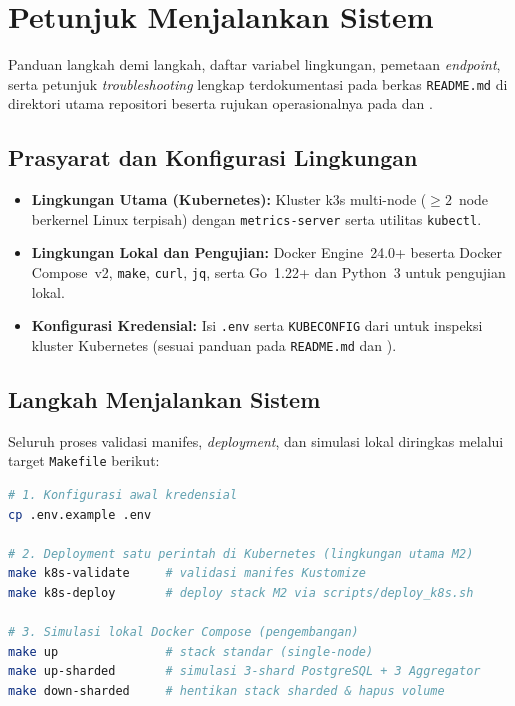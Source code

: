 \chapter{Petunjuk Menjalankan Sistem}
\label{chap:petunjuk}

Panduan langkah demi langkah, daftar variabel lingkungan, pemetaan \textit{endpoint}, serta petunjuk \textit{troubleshooting} lengkap terdokumentasi pada berkas \texttt{README.md} di direktori utama repositori beserta rujukan operasionalnya pada  dan .

\section{Prasyarat dan Konfigurasi Lingkungan}
\label{sec:petunjuk_prasyarat}

\begin{itemize}
    \item \textbf{Lingkungan Utama (Kubernetes):} Kluster k3s multi-node ($\ge 2$~node berkernel Linux terpisah) dengan \texttt{metrics-server} serta utilitas \texttt{kubectl}.
    \item \textbf{Lingkungan Lokal dan Pengujian:} Docker Engine~24.0+ beserta Docker Compose~v2, \texttt{make}, \texttt{curl}, \texttt{jq}, serta Go~1.22+ dan Python~3 untuk pengujian lokal.
    \item \textbf{Konfigurasi Kredensial:} Isi \texttt{.env} serta \texttt{KUBECONFIG} dari  untuk inspeksi kluster Kubernetes (sesuai panduan pada \texttt{README.md} dan ).
\end{itemize}

\section{Langkah Menjalankan Sistem}
\label{sec:petunjuk_menjalankan}

Seluruh proses validasi manifes, \textit{deployment}, dan simulasi lokal diringkas melalui target \texttt{Makefile} berikut:

\begin{lstlisting}[language=bash, caption={Ringkasan Perintah Menjalankan Sistem (Kubernetes dan Docker Compose)}]
# 1. Konfigurasi awal kredensial
cp .env.example .env

# 2. Deployment satu perintah di Kubernetes (lingkungan utama M2)
make k8s-validate     # validasi manifes Kustomize
make k8s-deploy       # deploy stack M2 via scripts/deploy_k8s.sh

# 3. Simulasi lokal Docker Compose (pengembangan)
make up               # stack standar (single-node)
make up-sharded       # simulasi 3-shard PostgreSQL + 3 Aggregator
make down-sharded     # hentikan stack sharded & hapus volume
\end{lstlisting}

